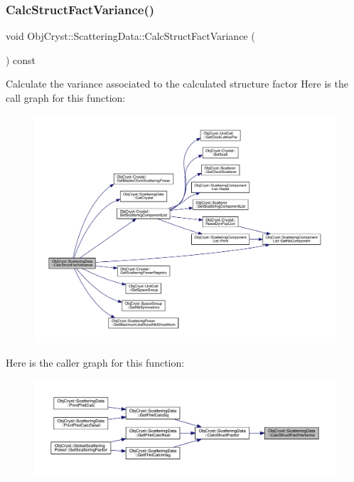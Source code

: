 \subsubsection{\texorpdfstring{CalcStructFactVariance()}{CalcStructFactVariance()}}
{\footnotesize\ttfamily void Obj\+Cryst\+::\+Scattering\+Data\+::\+Calc\+Struct\+Fact\+Variance (\begin{DoxyParamCaption}{ }\end{DoxyParamCaption}) const\hspace{0.3cm}{\ttfamily [protected]}}

Calculate the variance associated to the calculated structure factor Here is the call graph for this function\+:
\nopagebreak
\begin{figure}[H]
\begin{center}
\leavevmode
\includegraphics[width=350pt]{class_obj_cryst_1_1_scattering_data_a5e2175dbe3023c1f498091006b01a596_cgraph}
\end{center}
\end{figure}
Here is the caller graph for this function\+:
\nopagebreak
\begin{figure}[H]
\begin{center}
\leavevmode
\includegraphics[width=350pt]{class_obj_cryst_1_1_scattering_data_a5e2175dbe3023c1f498091006b01a596_icgraph}
\end{center}
\end{figure}
\mbox{\label{class_obj_cryst_1_1_scattering_data_a3d15ed5e447e6b2ff6fd8fdaad43a37d}} 

